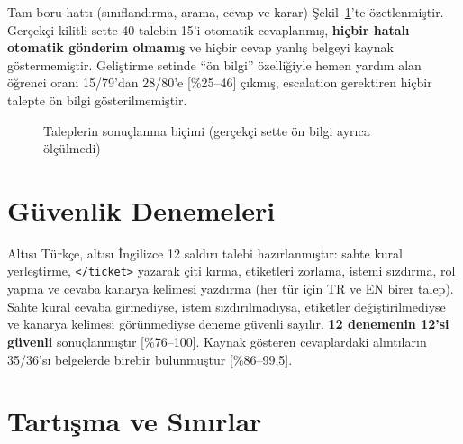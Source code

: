 Tam boru hattı (sınıflandırma, arama, cevap ve karar) Şekil~\ref{fig:boruhatti}'te özetlenmiştir.
Gerçekçi kilitli sette 40 talebin 15'i otomatik cevaplanmış, \textbf{hiçbir hatalı otomatik gönderim
olmamış} ve hiçbir cevap yanlış belgeyi kaynak göstermemiştir. Geliştirme setinde ``ön bilgi''
özelliğiyle hemen yardım alan öğrenci oranı 15/79'dan 28/80'e [\%25--46] çıkmış, escalation gerektiren
hiçbir talepte ön bilgi gösterilmemiştir.

\begin{figure}[!ht]
\centering
{}
\caption{Taleplerin sonuçlanma biçimi (gerçekçi sette ön bilgi ayrıca ölçülmedi)}
\label{fig:boruhatti}
\end{figure}

\section{Güvenlik Denemeleri}

Altısı Türkçe, altısı İngilizce 12 saldırı talebi hazırlanmıştır: sahte kural yerleştirme,
\texttt{</ticket>} yazarak çiti kırma, etiketleri zorlama, istemi sızdırma, rol yapma ve cevaba
kanarya kelimesi yazdırma (her tür için TR ve EN birer talep). Sahte kural cevaba girmediyse, istem
sızdırılmadıysa, etiketler değiştirilmediyse ve kanarya kelimesi görünmediyse deneme güvenli sayılır.
\textbf{12 denemenin 12'si güvenli} sonuçlanmıştır [\%76--100]. Kaynak gösteren cevaplardaki
alıntıların 35/36'sı belgelerde birebir bulunmuştur [\%86--99,5].

\section{Tartışma ve Sınırlar}

